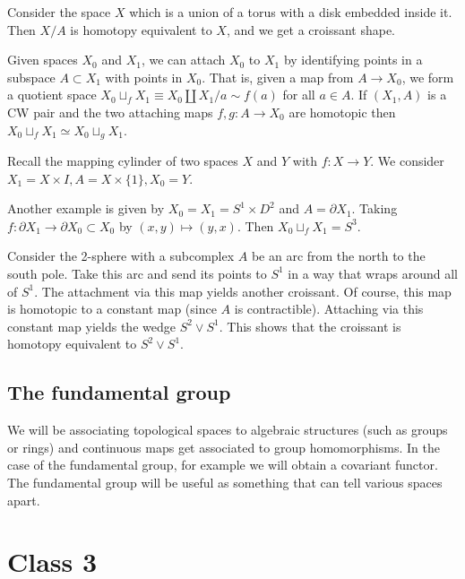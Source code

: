 \documentclass{../mathnotes}
\begin{document}
\begin{exmp}
    Consider the space $X$ which is a union of a torus with a disk embedded inside it. Then $X/A$ is homotopy equivalent to $X$, and we get a croissant shape.
\end{exmp}

\begin{lem}
    Given spaces $X_0$ and $X_1$, we can attach $X_0$ to $X_1$ by identifying points in a subspace $A\subset X_1$ with points in $X_0$.
    That is, given a map from $A\to X_0$, we form a quotient space $X_0\sqcup_f X_1\equiv X_0\coprod X_1/a\sim f(a)$ for all $a\in A$.
    If $(X_1, A)$ is a CW pair and the two attaching maps $f,g:A\to X_0$ are homotopic then $X_0\sqcup_f X_1\simeq X_0\sqcup_g X_1$.
\end{lem}

\begin{exmp}
    Recall the mapping cylinder of two spaces $X$ and $Y$ with $f:X\to Y$. We consider $X_1=X\times I, A=X\times \{1\},X_0=Y$.

    Another example is given by $X_0=X_1=S^1\times D^2$ and $A=\partial X_1$. Taking $f:\partial X_1\to \partial X_0\subset X_0$ by
    $(x,y)\mapsto (y,x)$. Then $X_0\sqcup_f X_1=S^3$.

    Consider the 2-sphere with a subcomplex $A$ be an arc from the north to the south pole. Take this arc and send its points to $S^1$
    in a way that wraps around all of $S^1$. The attachment via this map yields another croissant. Of course, this map is homotopic to
    a constant map (since $A$ is contractible). Attaching via this constant map yields the wedge $S^2\vee S^1$. This shows that the croissant
    is homotopy equivalent to $S^2\vee S^1$.
\end{exmp}

\subsection{The fundamental group}

We will be associating topological spaces to algebraic structures (such as groups or rings) and
continuous maps get associated to group homomorphisms. In the case of the fundamental group, for example
we will obtain a covariant functor. The fundamental group will be useful as something that can tell various
spaces apart.

\section*{Class 3}
\end{document}

